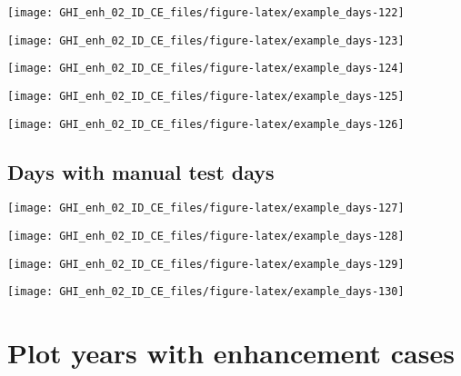 \documentclass[
  10pt,
  a4paper,oneside]{article}
\begin{document}
\begin{center}\texttt{[image: GHI\_enh\_02\_ID\_CE\_files/figure-latex/example\_days-122]} \end{center}

\begin{center}\texttt{[image: GHI\_enh\_02\_ID\_CE\_files/figure-latex/example\_days-123]} \end{center}

\begin{center}\texttt{[image: GHI\_enh\_02\_ID\_CE\_files/figure-latex/example\_days-124]} \end{center}

\begin{center}\texttt{[image: GHI\_enh\_02\_ID\_CE\_files/figure-latex/example\_days-125]} \end{center}

\begin{center}\texttt{[image: GHI\_enh\_02\_ID\_CE\_files/figure-latex/example\_days-126]} \end{center}

\FloatBarrier

\hypertarget{days-with-manual-test-days}{%
\subsection{Days with manual test days}\label{days-with-manual-test-days}}

\begin{center}\texttt{[image: GHI\_enh\_02\_ID\_CE\_files/figure-latex/example\_days-127]} \end{center}

\begin{center}\texttt{[image: GHI\_enh\_02\_ID\_CE\_files/figure-latex/example\_days-128]} \end{center}

\begin{center}\texttt{[image: GHI\_enh\_02\_ID\_CE\_files/figure-latex/example\_days-129]} \end{center}

\begin{center}\texttt{[image: GHI\_enh\_02\_ID\_CE\_files/figure-latex/example\_days-130]} \end{center}

\newpage
\FloatBarrier

\hypertarget{plot-years-with-enhancement-cases}{%
\section{Plot years with enhancement cases}\label{plot-years-with-enhancement-cases}}
\end{document}
